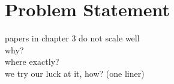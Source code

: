 \chapter{Problem Statement} \label{chap:probStatement}

papers in chapter 3 do not scale well\\
	why?\\
	where exactly?\\

we try our luck at it, how? (one liner)
